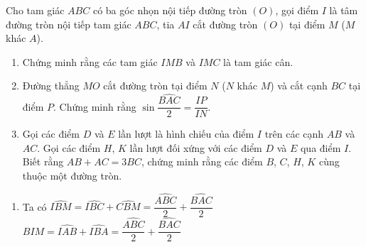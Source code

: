 \begin{ex}%
    Cho tam giác $ABC$ có ba góc nhọn nội tiếp đường tròn $(O)$, gọi điểm $I$ là tâm đường tròn nội tiếp tam giác $ABC$, tia $AI$ cắt đường tròn $(O)$ tại điểm $M$ ($M$ khác $A$).
    \begin{enumerate}
        \item Chứng minh rằng các tam giác $IMB$ và $IMC$ là tam giác cân.
        \item Đường thẳng $MO$ cắt đường tròn tại điểm $N$ ($N$ khác $M$) và cắt cạnh $BC$ tại điểm $P$. Chứng minh rằng $\sin\dfrac{\widehat{BAC}}{2}=\dfrac{IP}{IN}$.
        \item Gọi các điểm $D$ và $E$ lần lượt là hình chiếu của điểm $I$ trên các cạnh $AB$ và $AC$. Gọi các điểm $H$, $K$ lần lượt đối xứng với các điểm $D$ và $E$ qua điểm $I$. Biết rằng $AB+AC=3BC$, chứng minh rằng các điểm $B$, $C$, $H$, $K$ cùng thuộc một đường tròn.
    \end{enumerate}
\loigiai
    {\begin{center}
    \end{center}
    \begin{enumerate}
        \item Ta có $\widehat{IBM}=\widehat{IBC}+\widehat{CBM}=\dfrac{\widehat{ABC}}{2}+\dfrac{\widehat{BAC}}{2}$\\
        $\widehat{BIM}=\widehat{IAB}+\widehat{IBA}=\dfrac{\widehat{ABC}}{2}+\dfrac{\widehat{BAC}}{2}$\\

\end{enumerate}}
\end{ex}
